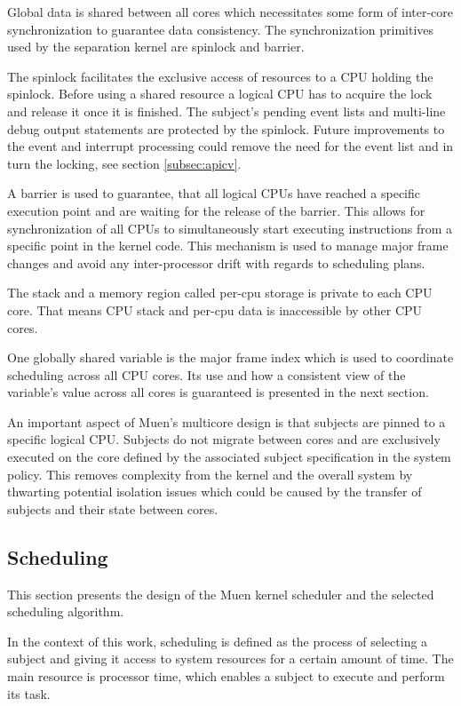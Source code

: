Global data is shared between all cores which necessitates some form of
inter-core synchronization to guarantee data consistency. The synchronization
primitives used by the separation kernel are spinlock and barrier.

The spinlock facilitates the exclusive access of resources to a CPU holding the
spinlock. Before using a shared resource a logical CPU has to acquire the lock
and release it once it is finished. The subject's pending event lists and
multi-line debug output statements are protected by the spinlock. Future
improvements to the event and interrupt processing could remove the need for the
event list and in turn the locking, see section \ref{subsec:apicv}.

A barrier is used to guarantee, that all logical CPUs have reached a specific
execution point and are waiting for the release of the barrier. This allows for
synchronization of all CPUs to simultaneously start executing instructions from
a specific point in the kernel code. This mechanism is used to manage major
frame changes and avoid any inter-processor drift with regards to scheduling
plans.

The stack and a memory region called per-cpu storage is private to each CPU
core. That means CPU stack and per-cpu data is inaccessible by other CPU cores.

One globally shared variable is the major frame index which is used to
coordinate scheduling across all CPU cores. Its use and how a consistent view of
the variable's value across all cores is guaranteed is presented in the next
section.

An important aspect of Muen's multicore design is that subjects are pinned to a
specific logical CPU. Subjects do not migrate between cores and are exclusively
executed on the core defined by the associated subject specification in the
system policy. This removes complexity from the kernel and the overall system by
thwarting potential isolation issues which could be caused by the transfer of
subjects and their state between cores.

\subsection{Scheduling}\label{subsec:design-scheduling}
This section presents the design of the Muen kernel scheduler and the selected
scheduling algorithm.

In the context of this work, scheduling is defined as the process of selecting
a subject and giving it access to system resources for a certain amount of time.
The main resource is processor time, which enables a subject to execute and
perform its task.

